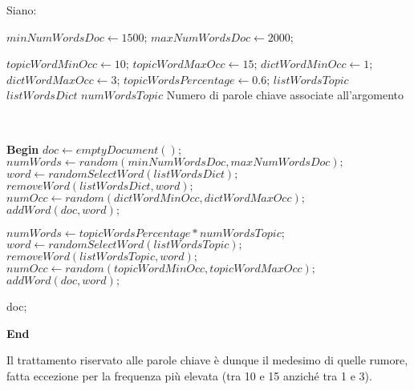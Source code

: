 \footnotesize
Siano:
\begin{algorithmic}
	\State $minNumWordsDoc\gets 1500$; 
	\State $maxNumWordsDoc\gets 2000$; 
			
	\State $topicWordMinOcc\gets 10$;	
	\State $topicWordMaxOcc\gets 15$;	
	\State $dictWordMinOcc\gets 1$;	
	\State $dictWordMaxOcc\gets 3$;	
	\State $topicWordsPercentage\gets 0.6$;	
	\State $listWordsTopic$ 
	\State $listWordsDict$ 
	\State $numWordsTopic$ 
	{Numero di parole chiave associate all'argomento}
\end{algorithmic}\ 
\begin{algorithmic}
	\State \textbf{Begin}
	\State $doc\gets emptyDocument();$
	\State $numWords\gets random(minNumWordsDoc, maxNumWordsDoc);$
		\State $word\gets randomSelectWord(listWordsDict);$
		\State $removeWord(listWordsDict, word);$
		\State $numOcc\gets random(dictWordMinOcc, dictWordMaxOcc);$ 
			\State $addWord(doc, word);$
		\EndFor
	\EndFor
	
	\State $numWords\gets topicWordsPercentage*numWordsTopic;$
		\State $word\gets randomSelectWord(listWordsTopic);$
		\State $removeWord(listWordsTopic, word);$
		\State $numOcc\gets random(topicWordMinOcc, topicWordMaxOcc);$ 
			\State $addWord(doc, word);$
		\EndFor
	\EndFor
	
	\Return doc;
	
	 \textbf{End}
\end{algorithmic}
\normalsize
Il trattamento riservato alle parole chiave è dunque il medesimo di quelle rumore, fatta eccezione per la frequenza più elevata (tra 10 e 15 anziché tra 1 e 3).

